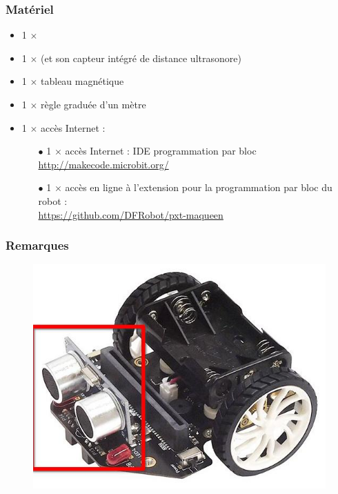 \subsubsection{Matériel}
\begin{itemize}
    \item 1 $\times$ \matosMb
    \item 1 $\times$ \matosMq (et son capteur intégré de distance ultrasonore)
    \item 1 $\times$ tableau magnétique
    \item 1 $\times$ règle graduée d'un mètre
    \item 1 $\times$ accès Internet :
    
    \begin{itemize}
        \item[$\bullet$] 1 $\times$ accès Internet : IDE programmation par bloc \url{http://makecode.microbit.org/}
        \item[$\bullet$] 1 $\times$ accès en ligne à l'extension pour la programmation par bloc du robot \mq :\\ \url{https://github.com/DFRobot/pxt-maqueen}
    \end{itemize}
    
\end{itemize}


\newpage
\subsubsection{Remarques}

\begin{figure}
    \includegraphics[width=\linewidth]
    {res/maqueen-fiche1-01.jpg}
\end{figure}

